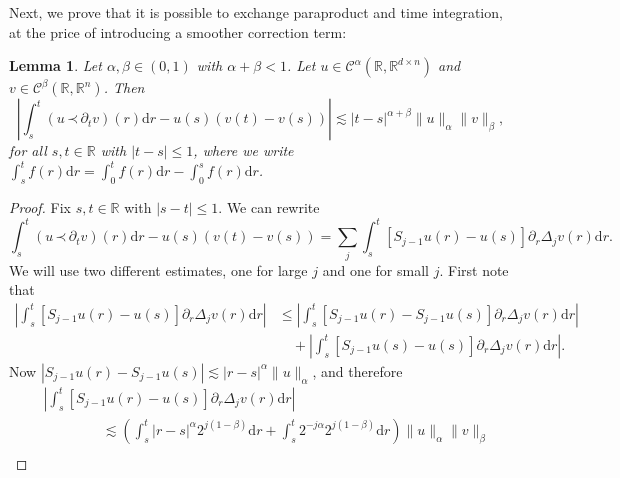 \documentclass[a4paper,11pt]{article}
\newcommand{\mathd}{\mathrm{d}}
\newtheorem{lemma}[theorem]{Lemma}
\theoremstyle{remark}
\newcommand{\R}{\mathbb{R}}
\newcommand{\CC}{\ensuremath{\mathscr{C}}}
\newcommand{\lpara}{\,\mathord{\prec}\,}
\begin{document}
Next, we prove that it is possible to exchange paraproduct and time integration, at the price of introducing a smoother correction term:

\begin{lemma}\label{lemma:controlled old and new}
  Let $\alpha , \beta \in ( 0,1 )$ with $\alpha + \beta <1$. Let $u \in \CC^\alpha(\R, \R^{d \times n})$ and $v \in \CC^{\beta}(\R, \R^n)$. Then
  \[
     \left| \int_{s}^{t} ( u \lpara \partial_{t} v ) ( r ) \mathd r-u ( s ) ( v ( t ) -v ( s ) ) \right| \lesssim | t-s |^{\alpha + \beta} \| u  \|_{\alpha} \| v \|_{\beta} ,
  \]
  for all $s,t \in \mathbb{R}$ with $| t-s | \leqslant 1$, where we write $\int_{s}^{t} f ( r ) \mathd r= \int_{0}^{t} f ( r ) \mathd r- \int_{0}^{s} f ( r ) \mathd r$.
\end{lemma}

\begin{proof}
  Fix $s,t \in \mathbb{R}$ with $| s-t | \leqslant 1$. We can rewrite
  \[
     \int_{s}^{t} ( u \lpara \partial_{t} v ) ( r ) \mathd r-u ( s ) ( v ( t ) -v ( s ) ) = \sum_{j} \int_{s}^{t} [ S_{j-1} u ( r ) -u ( s ) ] \partial_{r} \Delta_{j} v ( r ) \mathd r.
  \]
  We will use two different estimates, one for large $j$ and one for small $j$. First note that
  \begin{align*}
     \left| \int_{s}^{t} [ S_{j-1} u ( r ) -u ( s ) ] \partial_{r} \Delta_{j} v ( r ) \mathd r \right| & \leqslant \left| \int_{s}^{t} [ S_{j-1} u ( r ) -S_{j-1} u ( s ) ]  \partial_{r} \Delta_{j} v ( r ) \mathd r \right| \\
     &\quad + \left| \int_{s}^{t} [ S_{j-1} u ( s ) -u ( s ) ] \partial_{r} \Delta_{j} v ( r ) \mathd r  \right| .
  \end{align*}
  Now $| S_{j-1} u ( r ) - S_{j-1} u ( s ) | \lesssim | r-s |^\alpha \| u \|_{\alpha}$, %
  and therefore
  \begin{align}\label{eq:controlled old and new pr1} \nonumber
     &\left| \int_{s}^{t} [ S_{j-1} u ( r ) -u ( s ) ] \partial_{r} \Delta_{j} v ( r ) \mathd r \right| \\ \nonumber
     &\hspace{50pt} \lesssim \left( \int_{s}^{t}  | r-s |^\alpha 2^{j ( 1- \beta )} \mathd r+ \int_{s}^{t} 2^{-j \alpha} 2^{j ( 1- \beta )} \mathd r \right)\! \| u \|_{\alpha} \| v \|_{\beta} \\

\end{align}
\end{proof}
\end{document}
